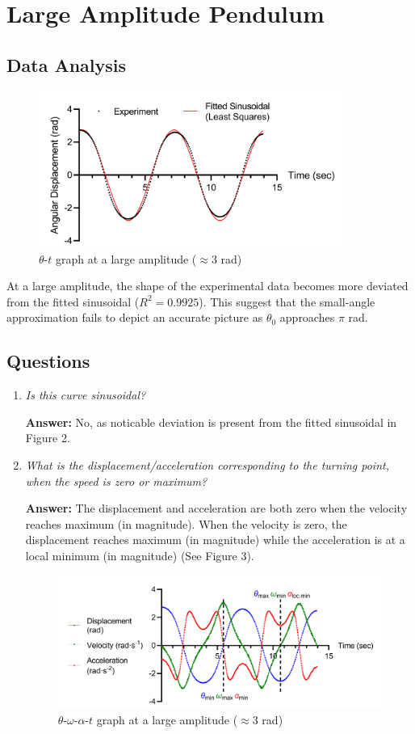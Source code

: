 \section{Large Amplitude Pendulum}
\subsection{Data Analysis}
\begin{figure}[H]
	\centering\includegraphics[width=10cm]{lg}
	\caption{$\theta$-$t$ graph at a large amplitude ($\approx3$ rad)}
\end{figure}
At a large amplitude, the shape of the experimental data becomes more deviated from the fitted sinusoidal ($R^2=0.9925$). This suggest that the small-angle approximation fails to depict an accurate picture as $\theta_0$ approaches $\pi$ rad.

\subsection{Questions}
\begin{enumerate}
	\item \emph{Is this curve sinusoidal?}
	
	\textbf{Answer: }No, as noticable deviation is present from the fitted sinusoidal in Figure 2.
$$$$
	\item \emph{What is the displacement/acceleration corresponding to the turning point, when the speed is zero or maximum?}
	
	\textbf{Answer: }The displacement and acceleration are both zero when the velocity reaches maximum (in magnitude). When the velocity is zero, the displacement reaches maximum (in magnitude) while the acceleration is at a local minimum (in magnitude) (See Figure 3).
	\begin{figure}[H]
		\centering\includegraphics[width=13cm]{lgg}
		\caption{$\theta$-$\omega$-$\alpha$-$t$ graph at a large amplitude ($\approx 3$ rad)}
		\label{$Frequency-Intensity$ Graph for $70$cm tube}
	\end{figure}
\end{enumerate}




